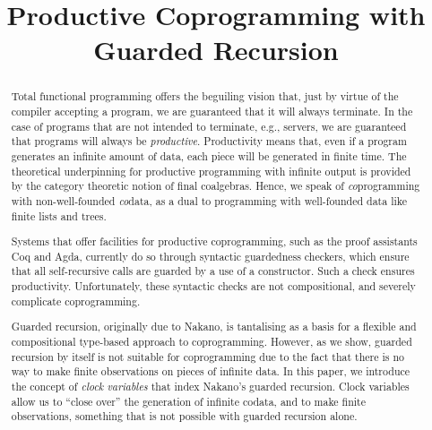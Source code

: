 \documentclass[natbib]{sigplanconf}
\title{Productive Coprogramming with Guarded Recursion}
\begin{document}
\exclusivelicense
{}

\maketitle

\begin{abstract}
  Total functional programming offers the beguiling vision that, just
  by virtue of the compiler accepting a program, we are guaranteed
  that it will always terminate. In the case of programs that are not
  intended to terminate, e.g., servers, we are guaranteed that
  programs will always be \emph{productive}. Productivity means that,
  even if a program generates an infinite amount of data, each piece
  will be generated in finite time. The theoretical underpinning for
  productive programming with infinite output is provided by the
  category theoretic notion of final coalgebras. Hence, we speak of
  \emph{co}programming with non-well-founded \emph{co}data, as a dual
  to programming with well-founded data like finite lists and trees.

  Systems that offer facilities for productive coprogramming, such as
  the proof assistants Coq and Agda, currently do so through syntactic
  guardedness checkers, which ensure that all self-recursive calls are
  guarded by a use of a constructor. Such a check ensures
  productivity. Unfortunately, these syntactic checks are not
  compositional, and severely complicate coprogramming.

  Guarded recursion, originally due to Nakano, is tantalising as a
  basis for a flexible and compositional type-based approach to
  coprogramming. However, as we show, guarded recursion by itself is
  not suitable for coprogramming due to the fact that there is no way
  to make finite observations on pieces of infinite data. In this
  paper, we introduce the concept of \emph{clock variables} that index
  Nakano's guarded recursion. Clock variables allow us to ``close
  over'' the generation of infinite codata, and to make finite
  observations, something that is not possible with guarded recursion
  alone.
\end{abstract}

  
\end{document}
